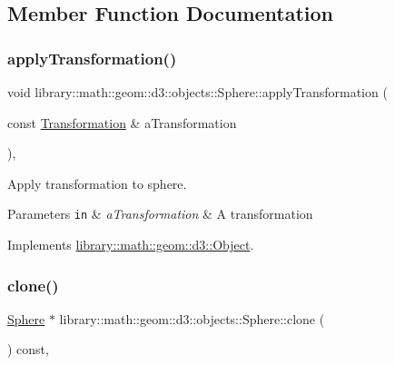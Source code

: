 \subsection{Member Function Documentation}
\mbox{\label{classlibrary_1_1math_1_1geom_1_1d3_1_1objects_1_1_sphere_acb4ca3f037791f9f71bffc904a1bf961}} 
\subsubsection{\texorpdfstring{apply\+Transformation()}{applyTransformation()}}
{\footnotesize\ttfamily void library\+::math\+::geom\+::d3\+::objects\+::\+Sphere\+::apply\+Transformation (\begin{DoxyParamCaption}\item[{const \hyperlink{classlibrary_1_1math_1_1geom_1_1d3_1_1_transformation}{Transformation} \&}]{a\+Transformation }\end{DoxyParamCaption})\hspace{0.3cm}{\ttfamily [override]}, {\ttfamily [virtual]}}



Apply transformation to sphere. 


\begin{DoxyParams}[1]{Parameters}
\mbox{\tt in}  & {\em a\+Transformation} & A transformation \\
\hline
\end{DoxyParams}


Implements \hyperlink{classlibrary_1_1math_1_1geom_1_1d3_1_1_object_a5fc47b1ee5d9a28efc6010d3d1512470}{library\+::math\+::geom\+::d3\+::\+Object}.

\mbox{\label{classlibrary_1_1math_1_1geom_1_1d3_1_1objects_1_1_sphere_a58370a8ff15b7c5a48cf4ffec5be3015}} 
\subsubsection{\texorpdfstring{clone()}{clone()}}
{\footnotesize\ttfamily \hyperlink{classlibrary_1_1math_1_1geom_1_1d3_1_1objects_1_1_sphere}{Sphere} $\ast$ library\+::math\+::geom\+::d3\+::objects\+::\+Sphere\+::clone (\begin{DoxyParamCaption}{ }\end{DoxyParamCaption}) const\hspace{0.3cm}{\ttfamily [override]}, {\ttfamily [virtual]}}



